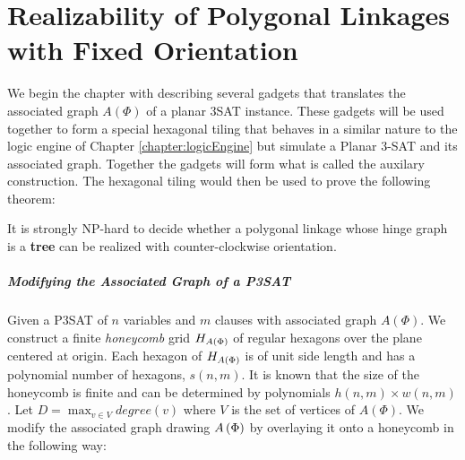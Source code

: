 \chapter{Realizability of Polygonal Linkages with Fixed Orientation\label{chapter:polygonalLinkage}}

We begin the chapter with describing several gadgets that translates the associated graph $A(\Phi)$ of a planar 3SAT instance.  
These gadgets will be used together to form a special hexagonal tiling that behaves in a similar nature to the logic engine of Chapter \ref{chapter:logicEngine} but simulate a Planar 3-SAT and its associated graph.
Together the gadgets will form what is called the auxilary construction.
The hexagonal tiling would then be used to prove the following theorem:
\begin{thm}\label{thm:hinge2}
It is strongly NP-hard to decide whether a polygonal linkage whose hinge graph is a \textbf{tree} can be realized with counter-clockwise orientation.
\end{thm}

\paragraph{Modifying the Associated Graph of a P3SAT}

Given a P3SAT of $n$ variables and $m$ clauses with associated graph $A(\Phi)$. 
We construct a finite \textit{honeycomb} grid $H_{A \left( \Phi \right)}$ of regular hexagons over the plane centered at origin.
Each hexagon of $H_{A \left( \Phi \right)}$ is of unit side length and has a polynomial number of hexagons, $s(n,m)$.
It is known that the size of the honeycomb is finite and can be determined by polynomials $h(n,m) \times w(n,m)$ \cite{BK+98}.
Let $D = \max_{v \in V} degree(v)$ where $V$ is the set of vertices of $A(\Phi)$.
We modify the associated graph drawing $A\left( \Phi \right)$ by overlaying it onto a honeycomb in the following way:

